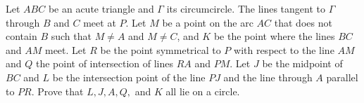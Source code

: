 Let $ABC$ be an acute triangle and $\Gamma$ its circumcircle. The lines tangent to $\Gamma$ through $B$ and $C$ meet at $P$. Let $M$ be a point on the arc $AC$ that does not contain $B$ such that $M \neq A$ and $M \neq C$,  and $K$ be the point where the lines $BC$ and $AM$ meet. Let $R$ be the point symmetrical to $P$ with respect to the line $AM$ and $Q$ the point of intersection of lines $RA$ and $PM$. Let $J$ be the midpoint of $BC$ and $L$ be the intersection point of the line $PJ$ and the line through $A$ parallel to $PR$. Prove that $L, J, A, Q,$ and $K$ all lie on a circle.